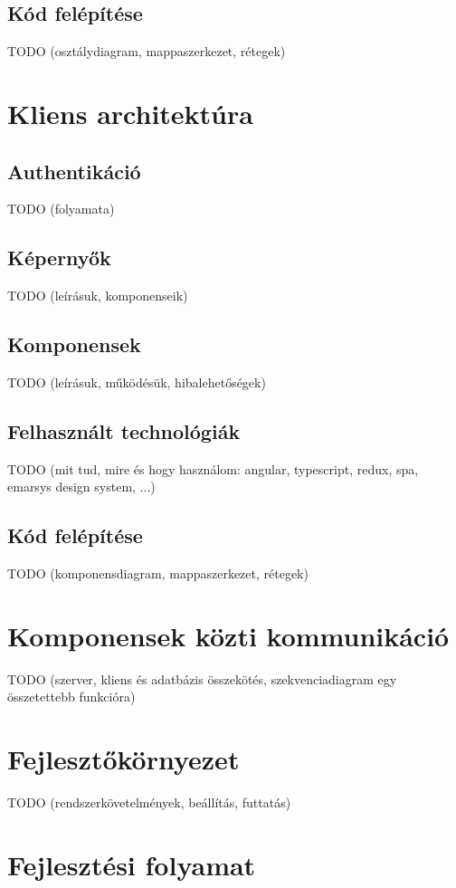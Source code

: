 \documentclass{elteikthesis}
\begin{document}
	\subsection{Kód felépítése}
	TODO (osztálydiagram, mappaszerkezet, rétegek)
	
	\section{Kliens architektúra}
	\subsection{Authentikáció}
	TODO (folyamata)
	
	\subsection{Képernyők}
	TODO (leírásuk, komponenseik)
	
	\subsection{Komponensek}
	TODO (leírásuk, működésük, hibalehetőségek)
	
	\subsection{Felhasznált technológiák}
	TODO (mit tud, mire és hogy használom: angular, typescript, redux, spa, emarsys design system, ...)
	
	\subsection{Kód felépítése}
	TODO (komponensdiagram, mappaszerkezet, rétegek)
	
	\section{Komponensek közti kommunikáció}
	TODO (szerver, kliens és adatbázis összekötés, szekvenciadiagram egy összetettebb funkcióra)
	
	\section{Fejlesztőkörnyezet}
	TODO (rendszerkövetelmények, beállítás, futtatás)
	
	\section{Fejlesztési folyamat}
\end{document}
